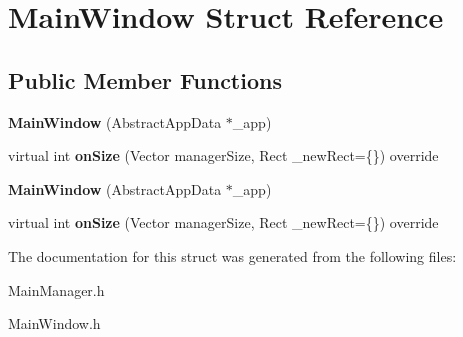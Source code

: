 \hypertarget{struct_main_window}{
\section{MainWindow Struct Reference}
\label{struct_main_window}
}
\subsection*{Public Member Functions}
\begin{DoxyCompactItemize}
\item 
\hypertarget{struct_main_window_aeaa6e32cedf84f6b1bebcaa649363631}{
{\bfseries MainWindow} (AbstractAppData $\ast$\_\-app)}
\label{struct_main_window_aeaa6e32cedf84f6b1bebcaa649363631}

\item 
\hypertarget{struct_main_window_ae135fdc461d4d39e884509fae4064aa5}{
virtual int {\bfseries onSize} (Vector managerSize, Rect \_\-newRect=\{\}) override}
\label{struct_main_window_ae135fdc461d4d39e884509fae4064aa5}

\item 
\hypertarget{struct_main_window_aeaa6e32cedf84f6b1bebcaa649363631}{
{\bfseries MainWindow} (AbstractAppData $\ast$\_\-app)}
\label{struct_main_window_aeaa6e32cedf84f6b1bebcaa649363631}

\item 
\hypertarget{struct_main_window_ae135fdc461d4d39e884509fae4064aa5}{
virtual int {\bfseries onSize} (Vector managerSize, Rect \_\-newRect=\{\}) override}
\label{struct_main_window_ae135fdc461d4d39e884509fae4064aa5}

\end{DoxyCompactItemize}


The documentation for this struct was generated from the following files:\begin{DoxyCompactItemize}
\item 
MainManager.h\item 
MainWindow.h\end{DoxyCompactItemize}
